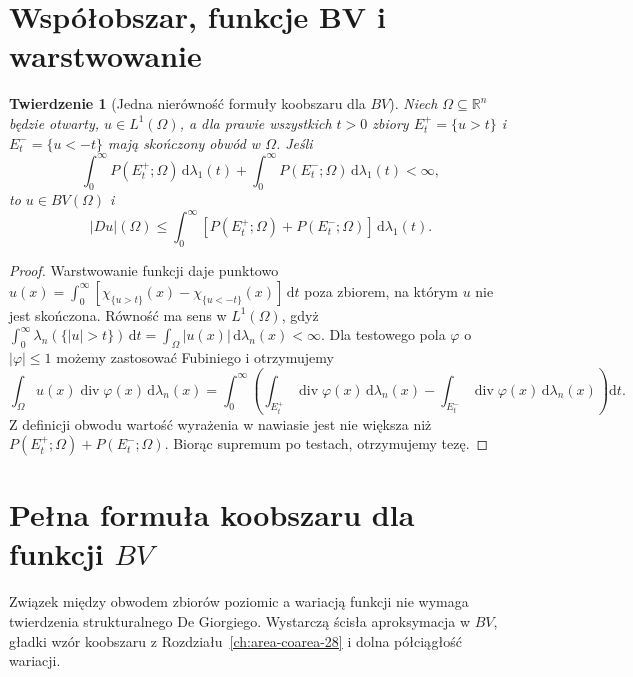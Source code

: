 \documentclass[11pt,a4paper,oneside]{book}
\numberwithin{equation}{chapter}
\theoremstyle{plain}
\newtheorem{twierdzenie}{Twierdzenie}[chapter]
\theoremstyle{definition}
\theoremstyle{remark}
\begin{document}
\section{Współobszar, funkcje BV i warstwowanie}
\begin{twierdzenie}[Jedna nierówność formuły koobszaru dla $BV$]
\label{thm:BV-layercake-29}
Niech $\Omega\subseteq\mathbb R^n$ będzie otwarty,
$u\in L^1(\Omega)$, a dla prawie wszystkich $t>0$
zbiory $E_t^+=\{u>t\}$ i $E_t^-=\{u<-t\}$
mają skończony obwód w $\Omega$. Jeśli
\[
 \int_0^\infty\!P(E_t^+;\Omega)\,\mathrm d\lambda_1(t)
 +\int_0^\infty\!P(E_t^-;\Omega)\,\mathrm d\lambda_1(t)<\infty,
\]
to $u\in BV(\Omega)$ i
\[
 |Du|(\Omega)\le\int_0^\infty
 [P(E_t^+;\Omega)+P(E_t^-;\Omega)]\,
 \mathrm d\lambda_1(t).
\]
\end{twierdzenie}
\begin{proof}
Warstwowanie funkcji daje punktowo
$u(x)=\int_0^\infty[\chi_{\{u>t\}}(x)
-\chi_{\{u<-t\}}(x)]\,\mathrm dt$
poza zbiorem, na którym $u$ nie jest skończona.
Równość ma sens w $L^1(\Omega)$, gdyż
$\int_0^\infty\lambda_n(\{|u|>t\})\,\mathrm dt
=\int_\Omega|u(x)|\,\mathrm d\lambda_n(x)<\infty$.
Dla testowego pola $\varphi$ o $|\varphi|\le1$
możemy zastosować Fubiniego i otrzymujemy
\[
 \int_\Omega u(x)\operatorname{div}\varphi(x)
 \,\mathrm d\lambda_n(x)
 =\int_0^\infty\!\left(
 \int_{E_t^+}\operatorname{div}\varphi(x)
 \,\mathrm d\lambda_n(x)
 -\int_{E_t^-}\operatorname{div}\varphi(x)
 \,\mathrm d\lambda_n(x)\right)\mathrm dt.
\]
Z definicji obwodu wartość wyrażenia w nawiasie
jest nie większa niż
$P(E_t^+;\Omega)+P(E_t^-;\Omega)$.
Biorąc supremum po testach, otrzymujemy tezę.
\end{proof}

\section{Pełna formuła koobszaru dla funkcji $BV$}
Związek między obwodem zbiorów poziomic a wariacją
funkcji nie wymaga twierdzenia strukturalnego De Giorgiego.
Wystarczą ścisła aproksymacja w $BV$, gładki wzór
koobszaru z Rozdziału~\ref{ch:area-coarea-28} i dolna
półciągłość wariacji.
\end{document}
